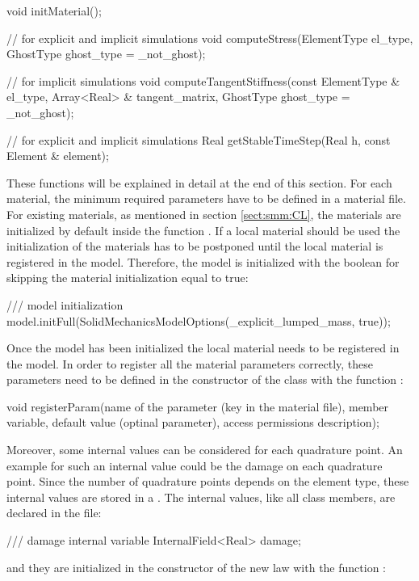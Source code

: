 \begin{cpp} void initMaterial();

  // for explicit and implicit simulations void
computeStress(ElementType el_type, GhostType ghost_type = _not_ghost);

  // for implicit simulations void computeTangentStiffness(const
ElementType & el_type, Array<Real> & tangent_matrix, GhostType
ghost_type = _not_ghost);

  // for explicit and implicit simulations Real getStableTimeStep(Real
h, const Element & element);
\end{cpp} These functions will be explained in detail at the end of
this section.  For each material, the minimum required parameters have
to be defined in a material file.  For existing materials, as
mentioned in section \ref{sect:smm:CL}, the materials are initialized
by default inside the function . If a local material
should be used the initialization of the materials has to be postponed
until the local material is registered in the model. Therefore, the
model is initialized with the boolean for skipping the material
initialization equal to true:
\begin{cpp} /// model initialization
  model.initFull(SolidMechanicsModelOptions(_explicit_lumped_mass,
  true));
\end{cpp} Once the model has been initialized the local material needs
to be registered in the model. In order to register all the material
parameters correctly, these parameters need to be defined in the
constructor of the class with the function
:
\begin{cpp} 
  void registerParam(name of the parameter (key in the
  material file), member variable, default value (optinal parameter),
  access permissions description);
\end{cpp} Moreover, some internal values can be considered for each
quadrature point. An example for such an internal value could be the
damage on each quadrature point. Since the number of quadrature points
depends on the element type, these internal values are stored in a
. The internal values, like all class
members, are declared in the  file:
\begin{cpp} 
  /// damage internal variable 
  InternalField<Real> damage;
\end{cpp} 
and they are initialized in the constructor of the new law with
the function :
